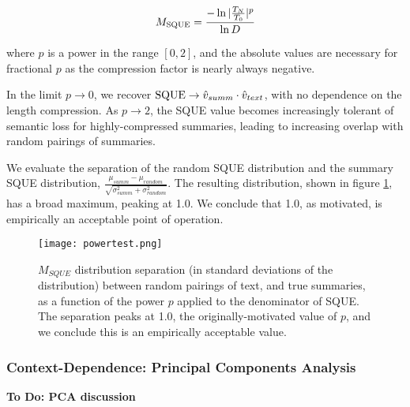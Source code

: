 \documentclass{article}
\newcommand\mycolor{\color{red}\xspace}
\begin{document}
{\begin{equation}
	M_{\rm SQUE} = \frac{-\ln|\frac{T_N}{T_0}|^p}{\ln D}
\end{equation}

where $p$ is a power in the range $\left[0,2\right]$, and the absolute values are necessary for fractional $p$ as the compression factor is nearly always negative.

In the limit $p \rightarrow 0$, we recover ${\rm SQUE} \rightarrow \hat{v}_{summ} \cdot \hat{v}_{text}$, with no dependence on the length compression.
As $p \rightarrow 2$, the SQUE value becomes increasingly tolerant of semantic loss for highly-compressed summaries, leading to increasing overlap with random pairings of summaries.

We evaluate the separation of the random SQUE distribution and the summary SQUE distribution, $\frac{\mu_{summ}-\mu_{random}}{\sqrt{\sigma_{summ}^2+\sigma_{random}^2}}$.
	The resulting distribution, shown in figure \ref{fig:powerseparation]}, has a broad maximum, peaking at 1.0.  We conclude that 1.0, as motivated, is empirically an acceptable point of operation.

\begin{figure}
	\centering
	\texttt{[image: powertest.png]}
	\caption{$M_{SQUE}$ distribution separation (in standard deviations of the distribution) between random pairings of text, and true summaries, as a function of the power $p$ applied to the denominator of SQUE.  The separation peaks at 1.0, the originally-motivated value of $p$, and we conclude this is an empirically acceptable value.}
	\label{fig:powerseparation]}
\end{figure}

\subsubsection{Context-Dependence: Principal Components Analysis}

\mycolor \textbf{To Do: PCA discussion} \normalcolor


}
\end{document}
